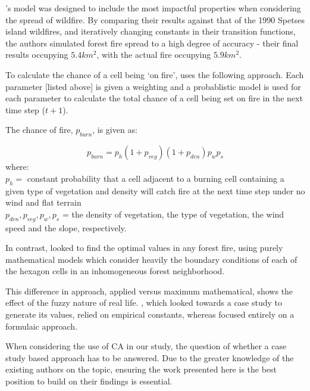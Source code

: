 \documentclass[11pt, a4paper, titlepage]{article}
\begin{document}
 \cite{ALEXANDRIDIS2008191}'s model was designed to include the most impactful properties when considering the spread of wildfire. By comparing their results against that of the 1990 Spetses island wildfires, and iteratively changing constants in their transition functions, the authors simulated forest fire spread to a high degree of accuracy - their final results occupying $5.4km^2$, with the actual fire occupying $5.9km^2$.

 To calculate the chance of a cell being `on fire', \cite{HERNANDEZENCINAS20071213} uses the following approach. Each parameter [listed above] is given a weighting and a probablistic model is used for each parameter to calculate the total chance of a cell being set on fire in the next time step ($t+1$).

 The chance of fire, $p_{burn}$, is given as:

 \[ p_{burn} = p_h(1+p_{veg})(1+p_{den})p_wp_s \]
 where: \\
 $p_h = $ constant probability that a cell adjacent to a burning cell containing a given type of vegetation and density will catch fire at the next time step under no wind and flat terrain \\
 $p_{den}, p_{veg}, p_w, p_s$ = the density of vegetation, the type of vegetation, the wind speed and the slope, respectively.

 In contrast, \cite{HERNANDEZENCINAS20071213} looked to find the optimal values in any forest fire, using purely mathematical models which consider heavily the boundary conditions of each of the hexagon cells in an inhomogeneous forest neighborhood.

 This difference in approach, applied versus maximum mathematical, shows the effect of the fuzzy nature of real life. \cite{ALEXANDRIDIS2008191}, which looked towards a case study to generate its values, relied on empirical constants, whereas \cite{HERNANDEZENCINAS20071213} focused entirely on a formulaic approach.

 When considering the use of CA in our study, the question of whether a case study based approach has to be answered. Due to the greater knowledge of the existing authors on the topic, ensuring the work presented here is the best position to build on their findings is essential.

 
\end{document}
